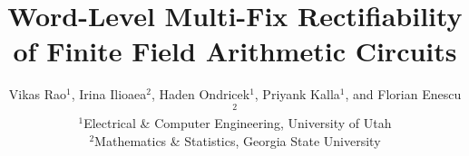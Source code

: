 \documentclass[conference]{IEEEtran}
\theoremstyle{definition}
\theoremstyle{plain}
\begin{document}
\title{\Large{ \sc Word-Level Multi-Fix Rectifiability of Finite Field Arithmetic Circuits}
}

\author{Vikas Rao$^1$, Irina Ilioaea$^2$, Haden Ondricek$^1$, Priyank Kalla$^1$,  and Florian Enescu$^2$\\
$^1$Electrical \& Computer Engineering, University of Utah\\
$^2$Mathematics \& Statistics, Georgia State University
}
% 
\maketitle


	





% 


% 

\end{document}
